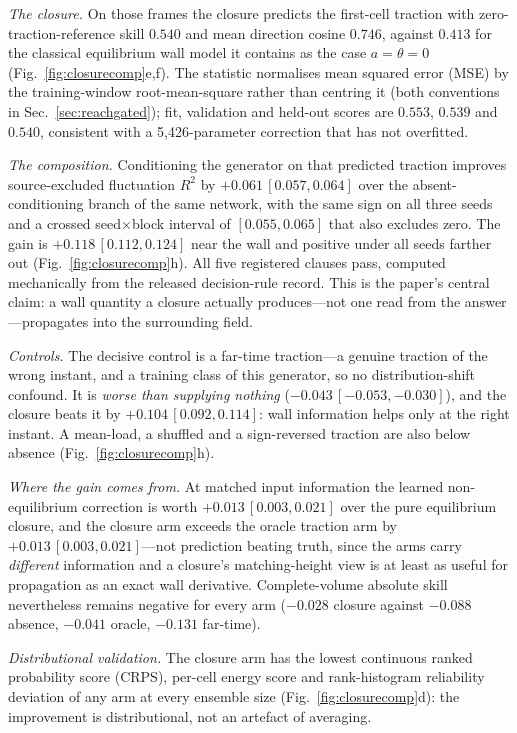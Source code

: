 \emph{The closure.} On those frames the closure predicts the first-cell traction with
zero-traction-reference skill $0.540$ and mean direction cosine $0.746$, against $0.413$ for the
classical equilibrium wall model it contains as the case $a=\theta=0$
(Fig.~\ref{fig:closurecomp}e,f). The statistic normalises mean squared error (MSE) by the training-window root-mean-square rather than centring it
(both conventions in Sec.~\ref{sec:reachgated}); fit, validation and held-out scores are
$0.553$, $0.539$ and $0.540$, consistent with a 5,426-parameter correction that has not
overfitted.

\emph{The composition.} Conditioning the generator on that predicted traction improves
source-excluded fluctuation $R^2$ by $+0.061\,[0.057,0.064]$ over the absent-conditioning branch
of the same network, with the same sign on all three seeds and a crossed seed$\times$block
interval of $[0.055,0.065]$ that also excludes zero. The gain is $+0.118\,[0.112,0.124]$ near the
wall and positive under all seeds farther out (Fig.~\ref{fig:closurecomp}h).
All five registered clauses pass, computed mechanically from the released decision-rule record.
This is the paper's central claim: a wall quantity a closure actually produces---not one read
from the answer---propagates into the surrounding field.

\emph{Controls.} The decisive control is a far-time traction---a genuine traction of the wrong
instant, and a training class of this generator, so no distribution-shift confound. It is
\emph{worse than supplying nothing} ($-0.043\,[-0.053,-0.030]$), and the closure beats it by
$+0.104\,[0.092,0.114]$: wall information helps only at the right instant. A mean-load, a
shuffled and a sign-reversed traction are also below absence
(Fig.~\ref{fig:closurecomp}h).

\emph{Where the gain comes from.} At matched input information the learned non-equilibrium
correction is worth $+0.013\,[0.003,0.021]$ over the pure equilibrium closure, and the closure
arm exceeds the oracle traction arm by $+0.013\,[0.003,0.021]$---not prediction beating truth,
since the arms carry \emph{different} information and a closure's matching-height view is at
least as useful for propagation as an exact wall derivative. Complete-volume absolute skill
nevertheless remains negative for every arm ($-0.028$ closure against $-0.088$ absence, $-0.041$
oracle, $-0.131$ far-time).

\emph{Distributional validation.} The closure arm has the lowest continuous ranked probability
score (CRPS), per-cell energy score
and rank-histogram reliability deviation of any arm at every ensemble size
(Fig.~\ref{fig:closurecomp}d): the improvement is distributional, not an artefact of averaging.

